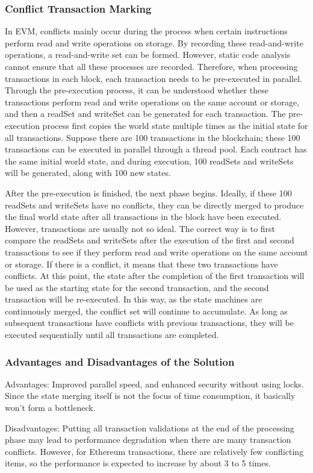 \subsubsection{Conflict Transaction Marking}

In EVM, conflicts mainly occur during the process when certain instructions perform read and write operations on storage. By recording these read-and-write operations, a read-and-write set can be formed. However, static code analysis cannot ensure that all these processes are recorded. Therefore, when processing transactions in each block, each transaction needs to be pre-executed in parallel. Through the pre-execution process, it can be understood whether these transactions perform read and write operations on the same account or storage, and then a readSet and writeSet can be generated for each transaction. The pre-execution process first copies the world state multiple times as the initial state for all transactions. Suppose there are 100 transactions in the blockchain; these 100 transactions can be executed in parallel through a thread pool. Each contract has the same initial world state, and during execution, 100 readSets and writeSets will be generated, along with 100 new states.

After the pre-execution is finished, the next phase begins. Ideally, if these 100 readSets and writeSets have no conflicts, they can be directly merged to produce the final world state after all transactions in the block have been executed. However, transactions are usually not so ideal. The correct way is to first compare the readSets and writeSets after the execution of the first and second transactions to see if they perform read and write operations on the same account or storage. If there is a conflict, it means that these two transactions have conflicts. At this point, the state after the completion of the first transaction will be used as the starting state for the second transaction, and the second transaction will be re-executed. In this way, as the state machines are continuously merged, the conflict set will continue to accumulate. As long as subsequent transactions have conflicts with previous transactions, they will be executed sequentially until all transactions are completed.

\subsubsection{Advantages and Disadvantages of the Solution}

Advantages: Improved parallel speed, and enhanced security without using locks. Since the state merging itself is not the focus of time consumption, it basically won't form a bottleneck.

Disadvantages: Putting all transaction validations at the end of the processing phase may lead to performance degradation when there are many transaction conflicts. However, for Ethereum transactions, there are relatively few conflicting items, so the performance is expected to increase by about 3 to 5 times.
